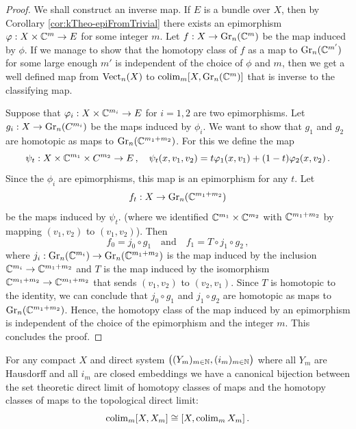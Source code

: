  \begin{proof}
	We shall construct an inverse map. If $E$ is a bundle over $X$, then by Corollary \ref{cor:kTheo-epiFromTrivial} there exists an epimorphism $\varphi:X\times \mathbb{C}^m \to E$ for some integer $m$. Let $f:X\to \operatorname{\mathrm{Gr}}_n(\mathbb{C}^m)$ be the map induced by $\phi$. If we manage to show that the homotopy class of $f$ as a map to $\operatorname{\mathrm{Gr}}_n(\mathbb{C}^{m'})$ for some large enough $m'$ is independent of the choice of $\phi$ and $m$, then we get a well defined map from $\operatorname{\mathrm{Vect}}_n(X)$ to $\operatorname{\mathrm{colim}}_m [X,\operatorname{\mathrm{Gr}}_n(\mathbb{C}^m)]$ that is inverse to the classifying map. 

	Suppose that $\varphi_i :X\times \mathbb{C}^{m_i}\to E$ for $i=1,2$ are two epimorphisms. Let $g_i:X\to \operatorname{\mathrm{Gr}}_n(C^{m_i})$ be the maps induced by $\phi_i$. We want to show that $g_1$ and $g_2$ are homotopic as maps to $\operatorname{\mathrm{Gr}}_n(\mathbb{C}^{m_1+m_2})$. For this we define the map
	\begin{equation*}
		\psi_t: X\times \mathbb{C}^{m_1}\times C^{m_2} \to E\,,\quad \psi_t(x,v_1,v_2)=t\varphi_1(x,v_1)+(1-t)\varphi_2(x,v_2)\,.
	\end{equation*} Since the $\phi_i$ are epimorphisms, this map is an epimorphism for any $t$. Let 
	\begin{equation*}
		f_t:X\to \operatorname{\mathrm{Gr}}_n(\mathbb{C}^{m_1+m_2})
	\end{equation*} be the maps induced by $\psi_t$. (where we identified $\mathbb{C}^{m_1}\times \mathbb{C}^{m_2}$ with $\mathbb{C}^{m_1+m_2}$ by mapping $(v_1,v_2)$ to $(v_1,v_2)$). Then 
	\begin{equation*}
		f_0=j_0\circ g_1\quad \text{and}\quad f_1=T \circ j_1\circ g_2\,,
	\end{equation*} where $j_i:\operatorname{\mathrm{Gr}}_n(\mathbb{C}^{m_i})\to \operatorname{\mathrm{Gr}}_n(\mathbb{C}^{m_1+m_2})$ is the map induced by the inclusion $\mathbb{C}^{m_i}\to \mathbb{C}^{m_1+m_2}$ and $T$ is the map induced by the isomorphism $\mathbb{C}^{m_1+m_2}\to \mathbb{C}^{m_1+m_2}$ that sends $(v_1,v_2)$ to $(v_2,v_1)$. Since $T$ is homotopic to the identity, we can conclude that $j_0\circ g_1$ and $j_1\circ g_2$ are homotopic as maps to $\operatorname{\mathrm{Gr}}_n(\mathbb{C}^{m_1+m_2})$. Hence, the homotopy class of the map induced by an epimorphism is independent of the choice of the epimorphism and the integer $m$. This concludes the proof.
 \end{proof}
 \begin{lemma}\label{lem:kTheo-colimUndHomVertauschen}
	For any compact $X$ and direct system $\big((Y_m)_{m\in \mathbb{N}},(i_m)_{m\in \mathbb{N}}\big)$ where all $Y_m$ are Hausdorff and all $i_m$ are closed embeddings we have a canonical bijection between the set theoretic direct limit of homotopy classes of maps and the homotopy classes of maps to the topological direct limit:
\begin{equation*} 
	\operatorname{\mathrm{colim}}_m [X,X_m] \cong [X,\operatorname{\mathrm{colim}}_mX_m]\,.
\end{equation*}
 \end{lemma}
